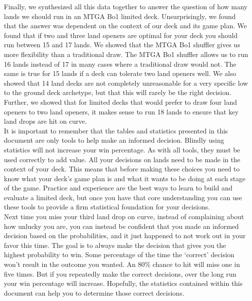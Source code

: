 \documentclass[oneside]{book}   %
\begin{document}
Finally, we synthesized all this data together to answer the question of how many lands we should run in an MTGA Bo1 limited deck. Unsurprisingly, we found that the answer was dependent on the context of our deck and its game plan. We found that if two and three land openers are optimal for your deck you should run between 15 and 17 lands. We showed that the MTGA Bo1 shuffler gives us more flexibility than a traditional draw. The MTGA Bo1 shuffler allows us to run 16 lands instead of 17 in many cases where a traditional draw would not. The same is true for 15 lands if a deck can tolerate two land openers well. We also showed that 14 land decks are not completely unreasonable for a very specific low to the ground deck archetype, but that this will rarely be the right decision. Further, we showed that for limited decks that would prefer to draw four land openers to two land openers, it makes sense to run 18 lands to ensure that key land drops are hit on curve.\\

It is important to remember that the tables and statistics presented in this document are only tools to help make an informed decision. Blindly using statistics will not increase your win percentage. As with all tools, they must be used correctly to add value. All your decisions on lands need to be made in the context of your deck. This means that before making these choices you need to know what your deck's game plan is and what it wants to be doing at each stage of the game. Practice and experience are the best ways to learn to build and evaluate a limited deck, but once you have that core understanding you can use these tools to provide a firm statistical foundation for your decisions.\\

Next time you miss your third land drop on curve, instead of complaining about how unlucky you are, you can instead be confident that you made an informed decision based on the probabilities, and it just happened to not work out in your favor this time. The goal is to always make the decision that gives you the highest probability to win. Some percentage of the time the `correct' decision won't result in the outcome you wanted. An 80\% chance to hit will miss one in five times. But if you repeatedly make the correct decisions, over the long run your win percentage will increase. Hopefully, the statistics contained within this document can help you to determine those correct decisions.\\
\end{document}
